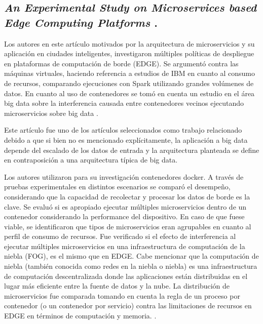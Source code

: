 \subsection{
  \textbf{\emph{An Experimental Study on Microservices based Edge Computing Platforms}
  }
  \cite{qu_experimental_2020}.
}

Los autores en este artículo motivados por la arquitectura de microservicios y su aplicación en ciudades inteligentes, investigaron múltiples políticas de despliegue en plataformas de computación de borde (EDGE). Se argumentó contra las máquinas virtuales, haciendo referencia a estudios de IBM en cuanto al consumo de recursos, comparando ejecuciones con Spark \cite{ApacheSpark} utilizando grandes volúmenes de datos. En cuanto al uso de contenedores se tomó en cuenta un estudio en el área big data sobre la interferencia causada entre contenedores vecinos ejecutando microservicios sobre big data \cite{BigDataWikipedia}.\par

Este artículo fue uno de los artículos seleccionados como trabajo relacionado debido a que si bien no es mencionado explícitamente, la aplicación a big data depende del escalado de los datos de entrada y la arquitectura planteada se define en contraposición a una arquitectura típica de big data.\par

Los autores utilizaron para su investigación contenedores docker.
A través de pruebas experimentales en distintos escenarios se comparó el desempeño, considerando que la capacidad de recolectar y procesar los datos de borde es la clave.
Se evaluó si es apropiado ejecutar múltiples microservicios dentro de un contenedor considerando la performance del dispositivo.
En caso de que fuese viable, se identificaron que tipos de microservicios eran agrupables en cuanto al perfil de consumo de recursos.
Fue verificado si el efecto de interferencia al ejecutar múltiples microservicios en una infraestructura de computación de la niebla (FOG), es el mismo que en EDGE. Cabe mencionar que la computación de niebla (también conocida como redes en la niebla o niebla)
es una infraestructura de computación descentralizada donde las aplicaciones están distribuidas en el lugar más eficiente entre la fuente de datos y la nube.
La distribución de microservicios fue comparada tomando en cuenta la regla de un proceso por contenedor (o un contenedor por servicio)
\cite{cont_por_serv}
contra las limitaciones de recursos en EDGE en términos de computación y memoria.
\cite{webfog}.\par

